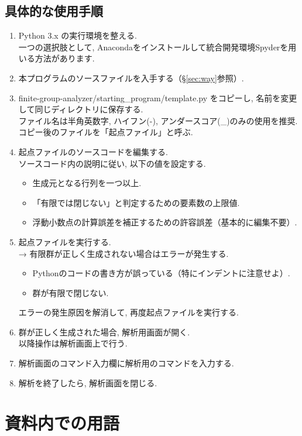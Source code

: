 \documentclass[11pt, a4paper]{jsarticle}
\begin{document}
\subsection{具体的な使用手順}
\begin{enumerate}
\item Python 3.x の実行環境を整える. \\
一つの選択肢として, Anacondaをインストールして統合開発環境Spyderを用いる方法があります.
\item 本プログラムのソースファイルを入手する（\S\ref{sec:way}参照）.
\item finite-group-analyzer/starting\_program/template.py をコピーし, 名前を変更して同じディレクトリに保存する. \\
ファイル名は半角英数字, ハイフン(-), アンダースコア(\_)のみの使用を推奨. \\
コピー後のファイルを「起点ファイル」と呼ぶ.
\item 起点ファイルのソースコードを編集する. \\
ソースコード内の説明に従い, 以下の値を設定する.
	\begin{itemize}
	\item 生成元となる行列を一つ以上.
	\item 「有限では閉じない」と判定するための要素数の上限値.
	\item 浮動小数点の計算誤差を補正するための許容誤差（基本的に編集不要）.
	\end{itemize}
\item 起点ファイルを実行する. \\
→ 有限群が正しく生成されない場合はエラーが発生する.
	\begin{itemize}
	\item Pythonのコードの書き方が誤っている（特にインデントに注意せよ）.
	\item 群が有限で閉じない.
	\end{itemize}
エラーの発生原因を解消して, 再度起点ファイルを実行する.
\item 群が正しく生成された場合, 解析用画面が開く. \\
以降操作は解析画面上で行う.
\item 解析画面のコマンド入力欄に解析用のコマンドを入力する.
\item 解析を終了したら, 解析画面を閉じる.
\end{enumerate}

\section{資料内での用語}
\end{document}
